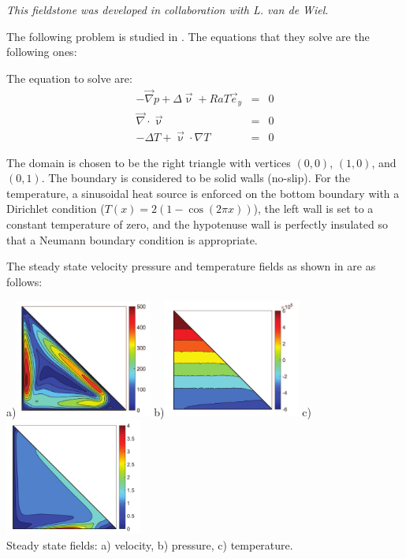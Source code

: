 {\sl This fieldstone was developed in collaboration with L. van de Wiel}. 


The following problem is studied in \cite{jolm17}. The equations that they solve are the following ones:

The equation to solve are:
\begin{eqnarray}
-\vec{\nabla}p + \Delta \vec{\upnu} + Ra T \vec{e}_y &=& 0\\
\vec\nabla\cdot\vec\upnu &=& 0 \\
-\Delta T + \vec\upnu\cdot\nabla T &=& 0
\end{eqnarray}

The domain is chosen to be the right triangle
with vertices $(0,0)$, $(1,0)$, and $(0,1)$. 
The boundary is considered to be solid walls (no-slip).
For the temperature, a sinusoidal heat source is enforced on the bottom
boundary with a Dirichlet condition ($T(x)=2(1-\cos (2\pi x))$), 
the left wall is set to a constant temperature
of zero, and the hypotenuse wall is perfectly insulated so that a Neumann 
boundary condition is appropriate.

The steady state velocity pressure and temperature fields as shown in 
\cite{jolm17} are as follows:

\begin{center}
a)\includegraphics[width=4.5cm]{python_codes/fieldstone_51/images/jolm17_vel}
b)\includegraphics[width=4.5cm]{python_codes/fieldstone_51/images/jolm17_p}
c)\includegraphics[width=4.5cm]{python_codes/fieldstone_51/images/jolm17_T}\\
{\small Steady state fields: a) velocity, b) pressure, c) temperature.}
\end{center}


